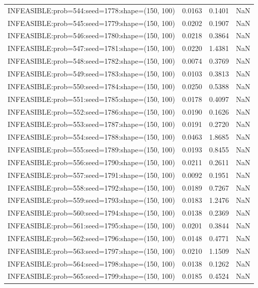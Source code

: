 \begin{longtable}{lccc}
INFEASIBLE:prob=544:seed=1778:shape=(150, 100) &   0.0163 &  0.1401 &    NaN \\
INFEASIBLE:prob=545:seed=1779:shape=(150, 100) &   0.0202 &  0.1907 &    NaN \\
INFEASIBLE:prob=546:seed=1780:shape=(150, 100) &   0.0218 &  0.3864 &    NaN \\
INFEASIBLE:prob=547:seed=1781:shape=(150, 100) &   0.0220 &  1.4381 &    NaN \\
INFEASIBLE:prob=548:seed=1782:shape=(150, 100) &   0.0074 &  0.3769 &    NaN \\
INFEASIBLE:prob=549:seed=1783:shape=(150, 100) &   0.0103 &  0.3813 &    NaN \\
INFEASIBLE:prob=550:seed=1784:shape=(150, 100) &   0.0250 &  0.5388 &    NaN \\
INFEASIBLE:prob=551:seed=1785:shape=(150, 100) &   0.0178 &  0.4097 &    NaN \\
INFEASIBLE:prob=552:seed=1786:shape=(150, 100) &   0.0190 &  0.1626 &    NaN \\
INFEASIBLE:prob=553:seed=1787:shape=(150, 100) &   0.0191 &  0.2720 &    NaN \\
INFEASIBLE:prob=554:seed=1788:shape=(150, 100) &   0.0463 &  1.8685 &    NaN \\
INFEASIBLE:prob=555:seed=1789:shape=(150, 100) &   0.0193 &  0.8455 &    NaN \\
INFEASIBLE:prob=556:seed=1790:shape=(150, 100) &   0.0211 &  0.2611 &    NaN \\
INFEASIBLE:prob=557:seed=1791:shape=(150, 100) &   0.0092 &  0.1951 &    NaN \\
INFEASIBLE:prob=558:seed=1792:shape=(150, 100) &   0.0189 &  0.7267 &    NaN \\
INFEASIBLE:prob=559:seed=1793:shape=(150, 100) &   0.0183 &  1.2476 &    NaN \\
INFEASIBLE:prob=560:seed=1794:shape=(150, 100) &   0.0138 &  0.2369 &    NaN \\
INFEASIBLE:prob=561:seed=1795:shape=(150, 100) &   0.0201 &  0.3844 &    NaN \\
INFEASIBLE:prob=562:seed=1796:shape=(150, 100) &   0.0148 &  0.4771 &    NaN \\
INFEASIBLE:prob=563:seed=1797:shape=(150, 100) &   0.0210 &  1.1509 &    NaN \\
INFEASIBLE:prob=564:seed=1798:shape=(150, 100) &   0.0138 &  0.1262 &    NaN \\
INFEASIBLE:prob=565:seed=1799:shape=(150, 100) &   0.0185 &  0.4524 &    NaN \\

\end{longtable}
